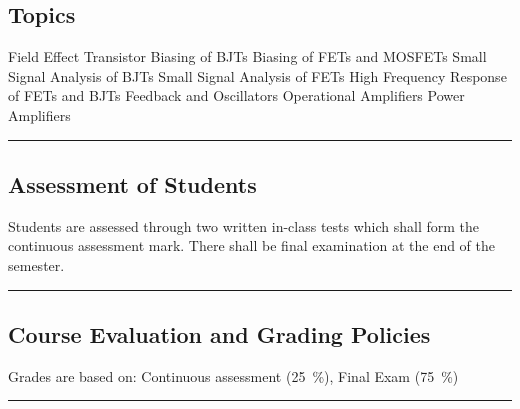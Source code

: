\subsection*{Topics}
\begin{outline}
    \1 Field Effect Transistor
    \1 Biasing of BJTs
    \1 Biasing of FETs and MOSFETs
    \1 Small Signal Analysis of BJTs
    \1 Small Signal Analysis of FETs
    \1 High Frequency Response of FETs and BJTs
    \1 Feedback and Oscillators
    \1 Operational Amplifiers
    \1 Power Amplifiers
\end{outline}
\vspace{2ex} \hrule\vspace{2ex}

\subsection*{Assessment of Students}
\begin{outline}
    \1 Students are assessed through two written in-class tests which shall form the continuous assessment mark.
    \1 There shall be final examination at the end of the semester.
\end{outline}
\vspace{2ex}\hrule\vspace{2ex}

\subsection*{Course Evaluation and Grading Policies}
Grades are based on:
Continuous assessment (\qty{25}{\percent}),
Final Exam (\qty{75}{\percent})
\vspace{2ex}\hrule\vspace{2ex}



